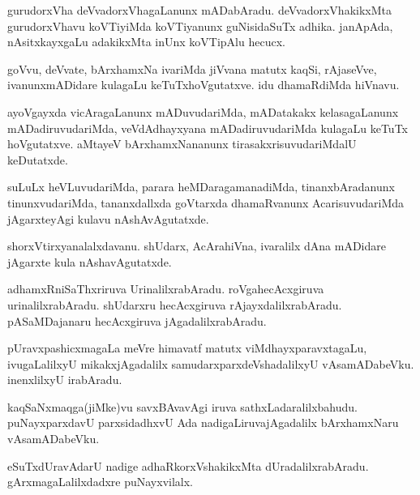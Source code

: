 \documentclass{article}
\begin{document}
\begin{mn}
gurudorxVha deVvadorxVhagaLanunx mADabAradu. deVvadorxVhakikxMta gurudorxVhavu koVTiyiMda 
koVTiyanunx guNisidaSuTx adhika. janApAda, nAsitxkayxgaLu adakikxMta inUnx koVTipAlu hecucx.
\end{mn}

\begin{mn}
goVvu, deVvate, bArxhamxNa ivariMda jiVvana matutx kaqSi, rAjaseVve, ivanunxmADidare kulagaLu 
keTuTxhoVgutatxve. idu dhamaRdiMda hiVnavu.
\end{mn}

\begin{mn}
ayoVgayxda vicAragaLanunx mADuvudariMda, mADatakakx kelasagaLanunx mADadiruvudariMda, 
veVdAdhayxyana mADadiruvudariMda kulagaLu keTuTx hoVgutatxve. aMtayeV bArxhamxNananunx 
tirasakxrisuvudariMdalU keDutatxde.
\end{mn}

\begin{mn}
suLuLx heVLuvudariMda, parara heMDaragamanadiMda, tinanxbAradanunx tinunxvudariMda, 
tananxdallxda goVtarxda dhamaRvanunx AcarisuvudariMda  jAgarxteyAgi kulavu nAshAvAgutatxde.
\end{mn}

\begin{mn}
shorxVtirxyanalalxdavanu. shUdarx, AcArahiVna, ivaralilx dAna mADidare jAgarxte kula 
nAshavAgutatxde.
\end{mn}

\begin{mn}
adhamxRniSaThxriruva UrinalilxrabAradu. roVgahecAcxgiruva urinalilxrabAradu. shUdarxru 
hecAcxgiruva rAjayxdalilxrabAradu. pASaMDajanaru hecAcxgiruva jAgadalilxrabAradu.
\end{mn}

\begin{mn}
pUravxpashicxmagaLa meVre himavatf matutx viMdhayxparavxtagaLu, ivugaLalilxyU mikakxjAgadalilx 
samudarxparxdeVshadalilxyU vAsamADabeVku. inenxlilxyU irabAradu.
\end{mn}

\begin{mn}
kaqSaNxmaqga(jiMke)vu savxBAvavAgi iruva sathxLadaralilxbahudu.  puNayxparxdavU parxsidadhxvU Ada
nadigaLiruvajAgadalilx bArxhamxNaru vAsamADabeVku.
\end{mn}

\begin{mn}
eSuTxdUravAdarU nadige adhaRkorxVshakikxMta dUradalilxrabAradu. gArxmagaLalilxdadxre puNayxvilalx.
\end{mn}
\end{document}
